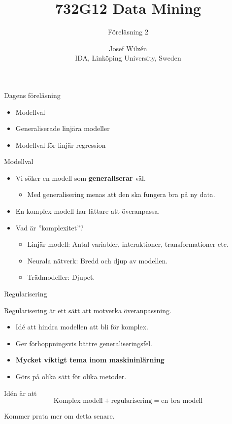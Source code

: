 \documentclass[10pt,english]{beamer}
\title{732G12 Data Mining}
\subtitle{Föreläsning 2}
\date{}
\author{Josef Wilzén \\ IDA, Linköping University, Sweden}
\begin{document}
\maketitle

\begin{frame}{Dagens föreläsning}
    
    \begin{itemize}
        \item Modellval
        \item Generaliserade linjära modeller
        \item Modellval för linjär regression
    \end{itemize}

\end{frame}

\begin{frame}{Modellval}
    
    \begin{itemize}
        \item Vi söker en modell som \textbf{generaliserar} väl.
        \begin{itemize}
            \item Med generalisering menas att den ska fungera bra på ny data.
        \end{itemize}
        \item En komplex modell har lättare att överanpassa.
        \item Vad är ''komplexitet''?
        \begin{itemize}
            \item Linjär modell: Antal variabler, interaktioner, transformationer etc.
            \item Neurala nätverk: Bredd och djup av modellen.
            \item Trädmodeller: Djupet.
        \end{itemize}
    \end{itemize}

\end{frame}

\begin{frame}{Regularisering}

    Regularisering är ett sätt att motverka överanpassning.

    \begin{itemize}
        \item Idé att hindra modellen att bli för komplex.
        \item Ger förhoppningsvis bättre generaliseringsfel.
        \item \textbf{Mycket viktigt tema inom maskininlärning}
        \item Görs på olika sätt för olika metoder.
    \end{itemize}

    Idén är att
    \begin{equation*}
        \text{Komplex modell} + \text{regularisering} = \text{en bra modell}
    \end{equation*}

    Kommer prata mer om detta senare.

\end{frame}
\end{document}
